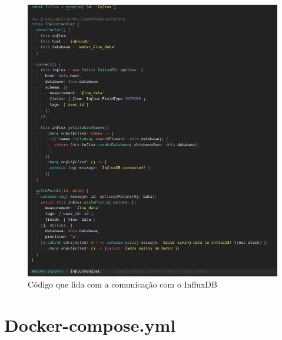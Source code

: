 \begin{figure}[htbp]
	\centering
	\includegraphics[width=1\linewidth]{figuras/mqttlogger/influx.png}
	\caption{Código que lida com a comunicação com o InfluxDB}
	\label{fig:influx}
\end{figure}

\chapter{Docker-compose.yml}

